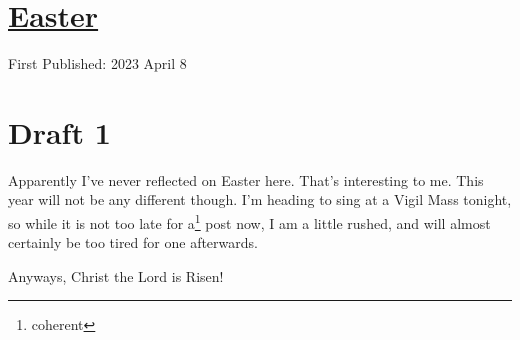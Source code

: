 \documentclass[12pt]{article}[titlepage]
\newcommand{\1}{\={a}}
\newcommand{\2}{\={e}}
\newcommand{\3}{\={\i}}
\newcommand{\4}{\=o}
\newcommand{\5}{\=u}
\newcommand{\6}{\={A}}
\renewcommand{\,}{\textsuperscript{,}}
\begin{document}
\doublespacing
\section{\href{easter-23.html}{Easter}}
First Published: 2023 April 8
\section{Draft 1}
Apparently I've never reflected on Easter here.
That's interesting to me.
This year will not be any different though.
I'm heading to sing at a Vigil Mass tonight, so while it is not too late for a\footnote{coherent} post now, I am a little rushed, and will almost certainly be too tired for one afterwards.

Anyways, Christ the Lord is Risen!
\end{document}
